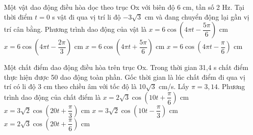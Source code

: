 \begin{ex}%
Một vật dao động điều hòa dọc theo trục Ox với biên độ 6 cm, tần số 2 Hz. Tại thời điểm $t = 0$ s vật đi qua vị trí li độ $-3\sqrt{3}$ cm và đang chuyển động lại gần vị trí cân bằng. Phương trình dao động của vật là
\choice
{\True $x=6\cos\left(4\pi t-\dfrac{5\pi}{6}\right)$ cm}
{$x=6\cos\left(4\pi t-\dfrac{2\pi}{3}\right)$ cm}
{$x=6\cos\left(4\pi t+\dfrac{5\pi}{6}\right)$ cm}
{$x=6\cos\left(4\pi t-\dfrac{\pi}{6}\right)$ cm}
\end{ex} 
\begin{ex} %
Một chất điểm dao động điều hòa trên trục Ox. Trong thời gian 31,4 s chất điểm thực hiện được 50 dao động toàn phần. Gốc thời gian là lúc chất điểm đi qua vị trí có li độ 3 cm theo chiều âm với tốc độ là 10$\sqrt{3}$ cm/s. Lấy $\pi = 3,14$. Phương trình dao động của chất điểm là
\choice 
{\True $x = 2\sqrt{3}\cos\left(10t + \dfrac{\pi}{6}\right)$ cm}
{$x = 3\sqrt{2}\cos\left(20t + \dfrac{\pi}{3}\right)$ cm}
{$x = 3\sqrt{2}\cos\left(10t - \dfrac{\pi}{3}\right)$ cm}
{$x = 2\sqrt{3}\cos\left(20t + \dfrac{\pi}{6}\right)$ cm}
\end{ex} 
